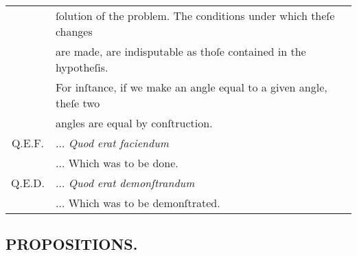 \begin{center}
\begin{minipage}{0.8\textwidth}
\begin{tabular}{c l}
                                                                                                             & ſolution of the problem. The conditions under which theſe changes                            \\
                                                                                                             & are made, are indisputable as thoſe contained in the hypotheſis.                             \\
                                                                                                             & For inſtance, if we make an angle equal to a given angle, theſe two                          \\
                                                                                                             & angles are equal by conſtruction.                                                            \\
            Q.E.F.                                                                                           & $\dots$ \textit{Quod erat faciendum}                                                         \\
                                                                                                             & $\dots$ Which was to be done.                                                                \\
            Q.E.D.                                                                                           & $\dots$ \textit{Quod erat demonſtrandum}                                                     \\
                                                                                                             & $\dots$ Which was to be demonſtrated.                                                        \\
        \end{tabular}
    \end{minipage}
\end{center}

\pagebreak

\pagestyle{fancy}
\fancyhf{}
\renewcommand{\headrulewidth}{0pt}
%

\begin{minipage}{0.67\textwidth}
    \subsection[Propositions]{\centering \scshape{\LARGE{PROPOSITIONS.}}}
    \label{subsec:propositions}
\end{minipage}

